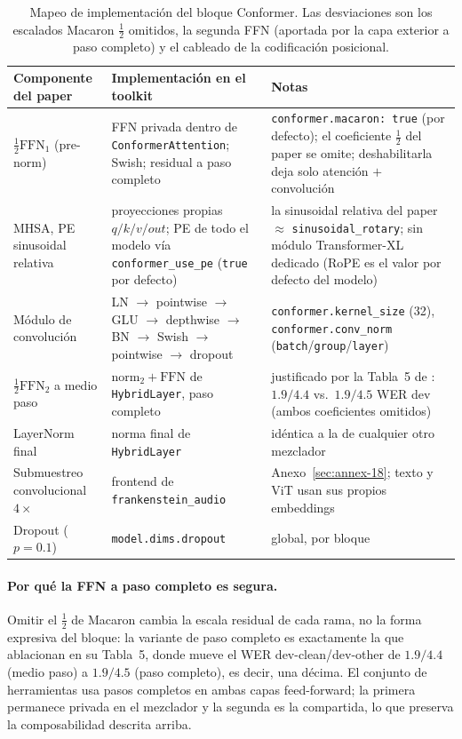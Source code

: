 \begin{table}[H]
\centering
\small
\begin{tabularx}{0.95\linewidth}{L{3.6cm}L{4.4cm}X}
\toprule
\textbf{Componente del paper} & \textbf{Implementación en el toolkit} & \textbf{Notas} \\
\midrule
$\tfrac{1}{2}\mathrm{FFN}_1$ (pre-norm) & FFN privada dentro de \texttt{ConformerAttention}; Swish; residual a paso completo & \texttt{conformer.macaron: true} (por defecto); el coeficiente $\tfrac12$ del paper se omite; deshabilitarla deja solo atención $+$ convolución \\
MHSA, PE sinusoidal relativa & proyecciones propias $q/k/v/out$; PE de todo el modelo vía \texttt{conformer\_use\_pe} (\texttt{true} por defecto) & la sinusoidal relativa del paper $\approx$ \texttt{sinusoidal\_rotary}; sin módulo Transformer-XL dedicado (RoPE es el valor por defecto del modelo) \\
Módulo de convolución & LN $\to$ pointwise $\to$ GLU $\to$ depthwise $\to$ BN $\to$ Swish $\to$ pointwise $\to$ dropout & \texttt{conformer.kernel\_size} (32), \texttt{conformer.conv\_norm} (\texttt{batch}/\texttt{group}/\texttt{layer}) \\
$\tfrac{1}{2}\mathrm{FFN}_2$ a medio paso & $\mathrm{norm}_2 + \mathrm{FFN}$ de \texttt{HybridLayer}, paso completo & justificado por la Tabla~5 de \citet{Gulati2020}: $1.9/4.4$ vs.\ $1.9/4.5$ WER dev (ambos coeficientes omitidos) \\
LayerNorm final & norma final de \texttt{HybridLayer} & idéntica a la de cualquier otro mezclador \\
Submuestreo convolucional $4\times$ & frontend de \texttt{frankenstein\_audio} & Anexo~\ref{sec:annex-18}; texto y ViT usan sus propios embeddings \\
Dropout ($p=0.1$) & \texttt{model.dims.dropout} & global, por bloque \\
\bottomrule
\end{tabularx}
\caption{Mapeo de implementación del bloque Conformer. Las desviaciones son los escalados Macaron $\tfrac12$ omitidos, la segunda FFN (aportada por la capa exterior a paso completo) y el cableado de la codificación posicional.}
\label{tab:conformer-mapping}
\end{table}

\paragraph{Por qué la FFN a paso completo es segura.} Omitir el $\tfrac12$ de Macaron cambia la escala residual de cada rama, no la forma expresiva del bloque: la variante de paso completo es exactamente la que \citet{Gulati2020} ablacionan en su Tabla~5, donde mueve el WER dev-clean/dev-other de $1.9/4.4$ (medio paso) a $1.9/4.5$ (paso completo), es decir, una décima. El conjunto de herramientas usa pasos completos en ambas capas feed-forward; la primera permanece privada en el mezclador y la segunda es la compartida, lo que preserva la composabilidad descrita arriba.

